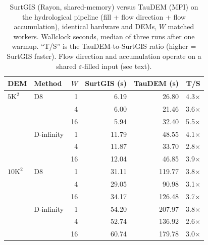 \documentclass[preprint,review,12pt,authoryear]{elsarticle}
\newif\ifmarkedrev
\newcommand{\revtext}[1]{\ifmarkedrev\textcolor{blue}{#1}\else#1\fi}
\begin{document}
\begin{table}[htbp]
\centering
\caption{\revtext{SurtGIS (Rayon, shared-memory) versus TauDEM (MPI) on the hydrological pipeline (fill + flow direction + flow accumulation), identical hardware and DEMs, $W$ matched workers. Wallclock seconds, median of three runs after one warmup. ``T/S'' is the TauDEM-to-SurtGIS ratio (higher = SurtGIS faster). Flow direction and accumulation operate on a shared $\varepsilon$-filled input (see text).}}
\label{tab:taudem_mpi}
\begin{tabular}{@{}llrrrr@{}}
\toprule
DEM & Method & $W$ & SurtGIS (s) & TauDEM (s) & T/S \\
\midrule
$5\text{K}^2$  & D8          & 1  & 6.19  & 26.80  & 4.3$\times$ \\
               &             & 4  & 6.00  & 21.46  & 3.6$\times$ \\
               &             & 16 & 5.94  & 32.40  & 5.5$\times$ \\
               & D-infinity  & 1  & 11.79 & 48.55  & 4.1$\times$ \\
               &             & 4  & 11.87 & 33.70  & 2.8$\times$ \\
               &             & 16 & 12.04 & 46.85  & 3.9$\times$ \\
$10\text{K}^2$ & D8          & 1  & 31.11 & 119.77 & 3.8$\times$ \\
               &             & 4  & 29.05 & 90.98  & 3.1$\times$ \\
               &             & 16 & 34.17 & 126.48 & 3.7$\times$ \\
               & D-infinity  & 1  & 54.20 & 207.97 & 3.8$\times$ \\
               &             & 4  & 52.74 & 136.92 & 2.6$\times$ \\
               &             & 16 & 60.74 & 179.78 & 3.0$\times$ \\
\bottomrule
\end{tabular}
\end{table}
\end{document}
